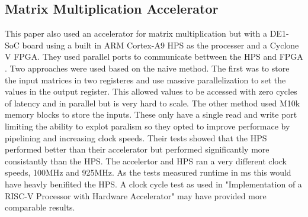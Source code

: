 \subsection{Matrix Multiplication Accelerator \citep{matrix_mult_accel}}
This paper also used an accelerator for matrix multiplication but with a DE1-SoC board using a built in ARM Cortex-A9 HPS as the processer and a Cyclone V FPGA. They used parallel ports to communicate bettween the HPS and FPGA \cite{pio}. Two approaches were used based on the naive method. The first was to store the input matrices in two registeres and use massive parallelization to set the values in the output register. This allowed values to be accessed with zero cycles of latency and in parallel but is very hard to scale. The other method used M10k memory blocks to store the inputs. These only have a single read and write port limiting the ability to explot paralism so they opted to improve performace by pipelining and increasing clock speeds. Their tests showed that the HPS performed better than their accelerator but performed significantly more consistantly than the HPS. The accelertor and HPS ran a very different clock speeds, 100MHz and 925MHz. As the tests measured runtime in ms this would have heavly benifited the HPS. A clock cycle test as used in "Implementation of a RISC-V Processor with Hardware Accelerator" may have provided more comparable results.